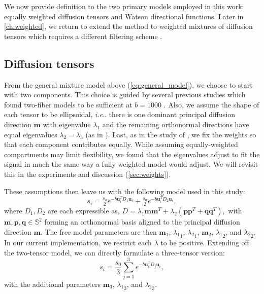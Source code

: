 \documentclass[final,hyperref]{gatech-thesis}
\makeatletter
\renewcommand{\v}[1]{\ensuremath{\mathbf #1}\xspace}
\DeclareRobustCommand\onedot{\futurelet\@let@token\@onedot}
\def\@onedot{\ifx\@let@token.\else.\null\fi\xspace}
\newcommand{\ie}{\textit{i.e}\onedot}
\renewcommand{\S}{\ensuremath{\mathbb S}}
\newcommand{\bn}[1]{\ensuremath{b\!=\!#1}\xspace}
\newcommand{\bone}{\bn{1000}}
\renewcommand{\u}{\v u}
\newcommand{\m}{\v m}
\newcommand{\lx}{{\ensuremath{\lambda_1}} \xspace}
\newcommand{\ly}{{\ensuremath{\lambda_2}} \xspace}
\makeatother
\begin{document}
We now provide definition to the two primary models employed in this work:
equally weighted diffusion tensors \cite{malcolm2009ipmi,malcolm2010tmi} and
Watson directional functions\cite{Rathi2009mia_w}.  Later in
\autoref{ch:weighted}, we return to extend the method to weighted mixtures of
diffusion tensors which requires a different filtering scheme
\cite{malcolm2009cukf}.



\subsection{Diffusion tensors} \label{sec:equal}

From the general mixture model above (\autoref{eq:general_model}), we choose
to start with two components.  This choice is guided by several previous
studies which found two-fiber models to be sufficient at \bone
\cite{Tuch2002,Kreher2005,Guo2006,Zhan2006,Peled2006,Behrens2007}.
%
Also, we assume the shape of each tensor to be ellipsoidal, \ie there is one
dominant principal diffusion direction \m with eigenvalue \lx and the
remaining orthonormal directions have equal eigenvalues $\ly=\lambda_3$ (as in
\cite{Parker2005,Friman2006,Peled2006,Kaden2007}).
%
Last, as in the study of \cite{Zhan2006}, we fix the weights so that each
component contributes equally.  While assuming equally-weighted compartments
may limit flexibility, we found that the eigenvalues adjust to fit the signal
in much the same way a fully weighted model would adjust.  We will revisit
this in the experiments and discussion (\autoref{sec:weights}).

These assumptions then leave us with the following model used in this study:
\begin{equation} \label{eq:2T_model}
  s_i = \tfrac{s_0}{2} e^{ -b \u_i^T D_1 \u_i } + \tfrac{s_0}{2} e^{ -b \u_i^T D_2 \u_i } ,
\end{equation}
where $D_1,D_2$ are each expressible as,
%
$ D = \lx \m \m^T + \ly\left(\v{p}\v{p}^T + \v{q}\v{q}^T\right), $
%
with $\m,\v{p},\v{q} \in \S^2$ forming an orthonormal basis aligned to the
principal diffusion direction \m.  The free model parameters are then $\m_1$,
$\lx_1$, $\ly_1$, $\m_2$, $\lx_2$, and $\ly_2$.  In our current
implementation, we restrict each $\lambda$ to be positive.  Extending off the
two-tensor model, we can directly formulate a three-tensor version:
\begin{equation}   \label{eq:3T_model}
  s_i = \frac{s_0}{3} \sum_{j=1}^3 e^{-b \u_i^T D_j \u_i } ,
\end{equation}
with the additional parameters $\m_3$, $\lx_3$, and $\ly_3$.
\end{document}
